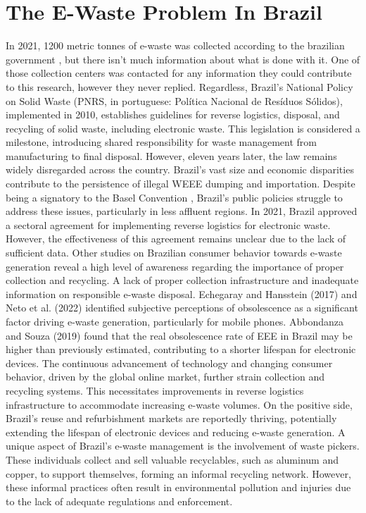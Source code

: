 \documentclass[sigconf, authorversion, nonacm]{acmart}
\begin{document}
\section{The E-Waste Problem In Brazil}
  In 2021, 1200 metric tonnes of e-waste was collected according to the brazilian government \cite[Ministério do Meio Ambiente, 2022]{Gov1}, but there isn’t much information about what is done with it. One of those collection centers was contacted for any information they could contribute to this research, however they never replied. Regardless, Brazil's National Policy on Solid Waste \cite{Gov2} (PNRS, in portuguese: Política Nacional de Resíduos Sólidos), implemented in 2010, establishes guidelines for reverse logistics, disposal, and recycling of solid waste, including electronic waste. This legislation is considered a milestone, introducing shared responsibility for waste management from manufacturing to final disposal. However, eleven years later, the law remains widely disregarded across the country. Brazil's vast size and economic disparities contribute to the persistence of illegal WEEE dumping and importation. Despite being a signatory to the Basel Convention \cite{Basel}, Brazil's public policies struggle to address these issues, particularly in less affluent regions. In 2021, Brazil approved a sectoral agreement for implementing reverse logistics for electronic waste. However, the effectiveness of this agreement remains unclear due to the lack of sufficient data. Other studies on Brazilian consumer behavior towards e-waste generation reveal a high level of awareness regarding the importance of proper collection and recycling. A lack of proper collection infrastructure and inadequate information on responsible e-waste disposal. Echegaray and Hansstein (2017) and Neto et al. (2022) identified subjective perceptions of obsolescence as a significant factor driving e-waste generation, particularly for mobile phones. Abbondanza and Souza (2019) found that the real obsolescence rate of EEE in Brazil may be higher than previously estimated, contributing to a shorter lifespan for electronic devices. The continuous advancement of technology and changing consumer behavior, driven by the global online market, further strain collection and recycling systems. This necessitates improvements in reverse logistics infrastructure to accommodate increasing e-waste volumes. On the positive side, Brazil's reuse and refurbishment markets are reportedly thriving, potentially extending the lifespan of electronic devices and reducing e-waste generation.  A unique aspect of Brazil's e-waste management is the involvement of waste pickers. These individuals collect and sell valuable recyclables, such as aluminum and copper, to support themselves, forming an informal recycling network. However, these informal practices often result in environmental pollution and injuries due to the lack of adequate regulations and enforcement.
\end{document}
